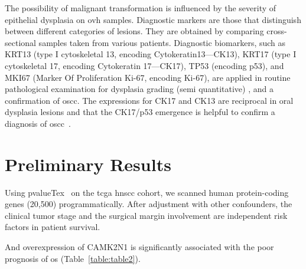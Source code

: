 \documentclass[12pt, a4paper]{article}
\newcommand{\comm}[1]{} %
\begin{document}
The possibility of malignant transformation is influenced by the severity of epithelial dysplasia on \acrshort{ovh} samples.
Diagnostic markers are those that distinguish between different categories of lesions. They are obtained by comparing cross-sectional samples taken from various patients.
Diagnostic biomarkers, such as KRT13 (type I cytoskeletal 13, encoding Cytokeratin13---CK13), KRT17 (type I cytoskeletal 17, encoding Cytokeratin 17---CK17), TP53 (encoding p53), and MKI67 (Marker Of Proliferation Ki-67, encoding Ki-67), are applied in routine pathological examination for dysplasia grading (semi quantitative) , and a confirmation of \acrshort{oscc}.
The expressions for CK17 and CK13 are reciprocal in oral dysplasia lesions and that the CK17/p53 emergence is helpful to confirm a diagnosis of \acrshort{oscc}~\citep{Mikami2011}.



\section{Preliminary Results}
Using pvalueTex~\citep{Chi2021} on the \acrshort{tcga} \acrshort{hnscc} cohort, we scanned human protein-coding genes (20,500) programmatically. After adjustment with other confounders, the clinical tumor stage and the surgical margin involvement are independent risk factors in patient survival. 

And overexpression of CAMK2N1 is significantly associated with the poor prognosis of \acrfull{os} (Table~\ref{table:table2}). 


\comm{
In our previous transtriptomics study~\citep{Chi2020}, %
the 9416 Kaplan-Meier plots with associated Cox's univariate and multivariate tables were generated by Cox modeling %
and justified by the ranking of hazard ratios.
The 967 genes were kept by criteria of uncorrected \textit{P} value (below 0.05) and \acrfull{hr} (greater than 1.5 or less than 0.5). %
At the final step, a stringent criteria (Bonferroni \textit{P} value correction) was used to yield a candidates: CAMK2N1. %
} %
\end{document}
